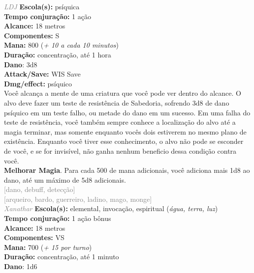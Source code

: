 \documentclass{RPG_Adventure}[2021/10/20]
\begin{document}
{\tiny \textcolor{gray}{\textit{LDJ}}}
{\small \t \textbf{Escola(s):} psíquica\\\t \textbf{Tempo conjuração:} 1 ação\\\t \textbf{Alcance:} 18 metros\\\t \textbf{Componentes:} S\\\t \textbf{Mana:} 800 (\textit{+ 10 a cada 10 minutos})\\\t \textbf{Duração:} concentração, até 1 hora\\\t \textbf{Dano}: 3d8\\\t \textbf{Attack/Save:} WIS Save\\\t \textbf{Dmg/effect:} psíquico\\}
{\normalsize Você alcança a mente de uma criatura que você pode ver dentro do alcance. O alvo deve fazer um teste de resistência de Sabedoria, sofrendo 3d8 de dano psíquico em um teste falho, ou metade do dano em um sucesso. Em uma falha do teste de resistência, você também sempre conhece a localização do alvo até a magia terminar, mas somente enquanto vocês dois estiverem no mesmo plano de existência. Enquanto você tiver esse conhecimento, o alvo não pode se esconder de você, e se for invisível, não ganha nenhum beneficio dessa condição contra você.\\\t \textbf{Melhorar Magia}. Para cada 500 de mana adicionais, você adiciona mais 1d8 ao dano, até um máximo de 5d8 adicionais.\\}
{\scriptsize \textcolor{gray}{[dano, debuff, detecção]\\}}
{\scriptsize \textcolor{gray}{[arqueiro, bardo, guerreiro, ladino, mago, monge]\\}}
{\tiny \textcolor{gray}{\textit{Xanathar}}}
{\small \t \textbf{Escola(s):} elemental, invocação, espiritual (\textit{água, terra, luz})\\\t \textbf{Tempo conjuração:} 1 ação bônus\\\t \textbf{Alcance:} 18 metros\\\t \textbf{Componentes:} VS\\\t \textbf{Mana:} 700 (\textit{+ 15 por turno})\\\t \textbf{Duração:} concentração, até 1 minuto\\\t \textbf{Dano}: 1d6\\}
\end{document}
